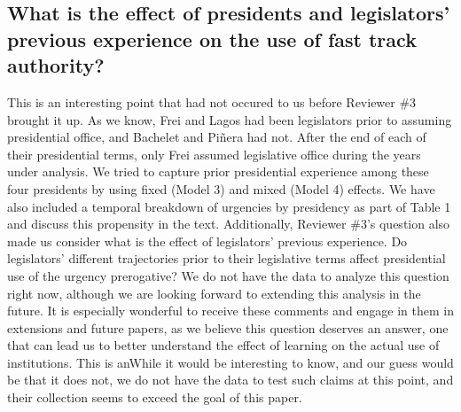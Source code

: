 \documentclass[article,letterpaper,times,12pt,listings-bw,microtype]{article}
\begin{document}
\subsection{What is the effect of presidents and legislators' previous experience on the use of fast track authority?}
This is an interesting point that had not occured to us before Reviewer \#3 brought it up. As we know, Frei and Lagos had been legislators prior to assuming presidential office, and Bachelet and Piñera had not. After the end of each of their presidential terms, only Frei assumed legislative office during the years under analysis. We tried to  capture prior presidential experience among these four presidents by using fixed (Model 3) and mixed (Model 4) effects. We have also included a temporal breakdown of urgencies by presidency as part of Table 1 and  discuss this propensity in the text. Additionally, Reviewer \#3's question also made us consider what is the effect of legislators' previous experience. Do legislators' different trajectories prior to their legislative terms affect presidential use of the urgency prerogative? We do not have the data to analyze this question right now, although we are looking forward to extending this analysis in the future. It is especially wonderful to receive these comments and engage in them in extensions and future papers, as we believe this question deserves an answer, one that can lead us to better understand the effect of learning on the actual use of institutions.  This is anWhile it would be interesting to know, and our guess would be that it does not, we do not have the data to test such claims at this point, and their collection seems to exceed the goal of this paper.
 




\end{document}
